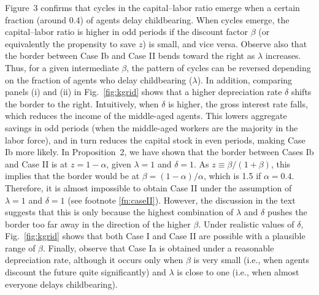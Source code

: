 \documentclass{MBE}%
\begin{document}
{Figure~3 confirms that cycles in the capital--labor ratio emerge when a certain fraction (around
0.4) of agents delay childbearing. When cycles emerge, the capital--labor ratio is higher in odd
periods if the discount factor $\beta$ (or equivalently the propensity to save $z$) is small, and
vice versa. Observe also that the border between Case Ib and Case II bends toward the right as
$\lambda$ increases. Thus, for a given intermediate $\beta$, the pattern of cycles can be reversed
depending on the fraction of agents who delay childbearing ($\lambda$). In addition, comparing
panels (i) and (ii) in Fig.\ \ref{fig:kgrid} shows that a higher depreciation rate $\delta$ shifts
the border to the right. Intuitively, when $\delta$ is higher, the gross interest rate falls,
which reduces the income of the middle-aged agents. This lowers aggregate savings in odd periods
(when the middle-aged workers are the majority in the labor force), and in turn reduces the
capital stock in even periods, making Case Ib more likely. {\label{fn:border} In Proposition~2, we
have shown that the border between Cases Ib and Case II is at $z=1-\alpha$, given $\lambda=1$ and
$\delta=1$. As $z\equiv \beta/(1+\beta)$, this implies that the border would be at $\beta
=(1-\alpha)/\alpha$, which is 1.5 if $\alpha=0.4$. Therefore, it is almost impossible to obtain
Case II under the assumption of $\lambda=1$ and $\delta=1$ (see footnote \ref{fn:caseII}).
However, the discussion in the text suggests that this is only because the highest combination of
$\lambda$ and $\delta$ pushes the border too far away in the direction of the higher $\beta $.
Under realistic values of $\delta$, Fig.\ \ref{fig:kgrid} shows that both Case I and Case II are
possible with a plausible range of $\beta$.} Finally, observe that Case Ia is obtained under a
reasonable depreciation rate, although it occurs only when $\beta$ is very small (i.e., when
agents discount the future quite significantly) and $\lambda$ is close to one (i.e., when almost
everyone delays childbearing).

}
\end{document}

